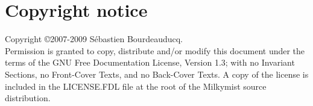 \documentclass[a4paper,11pt]{article}
\begin{document}
\section*{Copyright notice}
Copyright \copyright 2007-2009 S\'ebastien Bourdeauducq. \\
Permission is granted to copy, distribute and/or modify this document under the terms of the GNU Free Documentation License, Version 1.3; with no Invariant Sections, no Front-Cover Texts, and no Back-Cover Texts. A copy of the license is included in the LICENSE.FDL file at the root of the Milkymist source distribution.
\end{document}
